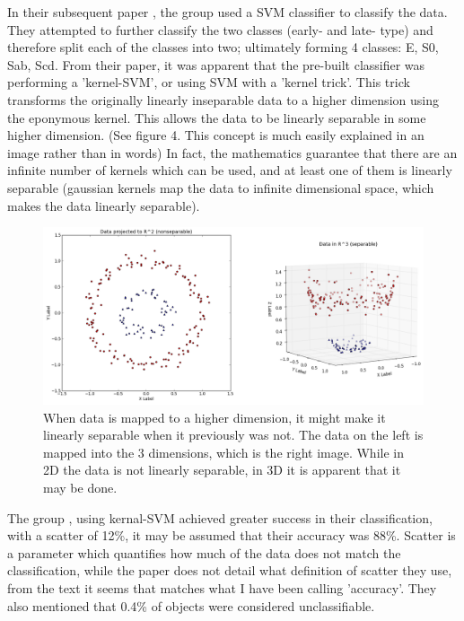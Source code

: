 \documentclass[a4paper,11pt]{article}
\begin{document}
In their subsequent paper \cite{huertascompany_2010_revisiting}, the group used a SVM classifier to classify the data. They attempted to further classify the two classes (early- and late- type) and therefore split each of the classes into two; ultimately forming 4 classes: E, S0, Sab, Scd. From their paper, it was apparent that the pre-built classifier was performing a 'kernel-SVM', or using SVM with a 'kernel trick'. This trick transforms the originally linearly inseparable data to a higher dimension using the eponymous kernel. This allows the data to be linearly separable in some higher dimension. (See figure 4. This concept is much easily explained in an image rather than in words) In fact, the mathematics guarantee that there are an infinite number of kernels which can be used, and at least one of them is linearly separable (gaussian kernels map the data to infinite dimensional space, which makes the data linearly separable). 
\begin{figure}[ht]
\centering
\includegraphics[width=\textwidth]{kernelSVM.png}
\caption{\label{fig:kernelSVM}When data is mapped to a higher dimension, it might make it linearly separable when it previously was not. The data on the left is mapped into the 3 dimensions, which is the right image. While in 2D the data is not linearly separable, in 3D it is apparent that it may be done.\cite{saptashwabhattacharyya_2018_understanding}}
\end{figure}

The group \cite{huertascompany_2007_a} , using kernal-SVM achieved greater success in their classification, with a scatter of 12\%, it may be assumed that their accuracy was 88\%. Scatter is a parameter which quantifies how much of the data does not match the classification, while the paper does not detail what definition of scatter they use, from the text it seems that matches what I have been calling 'accuracy'. They also mentioned that 0.4\% of objects were considered unclassifiable.  
\end{document}
